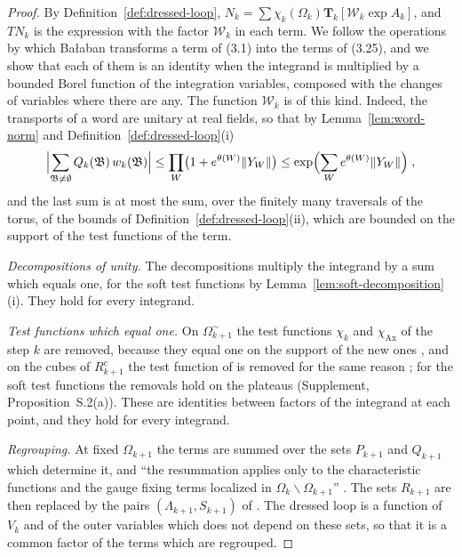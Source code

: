 \documentclass[11pt]{preprint}
\DeclarePairedDelimiter{\norm}{\lVert}{\rVert}
\numberwithin{equation}{section}
\theoremstyle{definition}
\theoremstyle{remark}
\theoremstyle{plain}
\begin{document}
\begin{proof}
By Definition~\ref{def:dressed-loop}, $N_k = \sum\chi_k(\Omega_k)\mathbf T_k[\mathcal W_k\exp A_k]$, and $TN_k$ is the expression \cite[(3.1), p.~264]{BalabanCRE} with the factor $\mathcal W_k$ in each term. We follow the operations by which Ba{\l}aban transforms a term of (3.1) into the terms of (3.25), and we show that each of them is an identity when the integrand is multiplied by a bounded Borel function of the integration variables, composed with the changes of variables where there are any. The function $\mathcal W_k$ is of this kind. Indeed, the transports of a word are unitary at real fields, so that by Lemma~\ref{lem:word-norm} and Definition~\ref{def:dressed-loop}(i)
\[
    \Bigl\lvert\sum_{\mathfrak B \neq \emptyset}Q_k(\mathfrak B)\,w_k(\mathfrak B)\Bigr\rvert \leq \prod_W\bigl(1 + e^{\theta(W)}\norm{Y_W}\bigr) \leq \exp\Bigl(\sum_We^{\theta(W)}\norm{Y_W}\Bigr)\;,
\]
and the last sum is at most the sum, over the finitely many traversals of the torus, of the bounds of Definition~\ref{def:dressed-loop}(ii), which are bounded on the support of the test functions of the term.

\emph{Decompositions of unity.} The decompositions \cite[(3.2), (3.3), p.~265; (3.16), p.~268]{BalabanCRE} multiply the integrand by a sum which equals one, for the soft test functions by Lemma~\ref{lem:soft-decomposition}(i). They hold for every integrand.

\emph{Test functions which equal one.} On $\Omega_{k+1}^{\sim}$ the test functions $\chi_k$ and $\chi_{\mathrm{Ax}}$ of the step $k$ are removed, because they equal one on the support of the new ones \cite[(3.8), (3.9), p.~266]{BalabanCRE}, and on the cubes of $R_{k+1}^c$ the test function of \cite[(3.3)]{BalabanCRE} is removed for the same reason \cite[(3.17)--(3.19), pp.~268--269]{BalabanCRE}; for the soft test functions the removals hold on the plateaus (Supplement, Proposition~S.2(a)). These are identities between factors of the integrand at each point, and they hold for every integrand.

\emph{Regrouping.} At fixed $\Omega_{k+1}$ the terms are summed over the sets $P_{k+1}$ and $Q_{k+1}$ which determine it, and ``the resummation applies only to the characteristic functions and the gauge fixing terms localized in $\Omega_k \backslash \Omega_{k+1}$'' \cite[p.~267]{BalabanCRE}. The sets $R_{k+1}$ are then replaced by the pairs $(\Lambda_{k+1}, S_{k+1})$ of \cite[(3.20), p.~269]{BalabanCRE}. The dressed loop is a function of $V_k$ and of the outer variables which does not depend on these sets, so that it is a common factor of the terms which are regrouped.


\end{proof}
\end{document}
